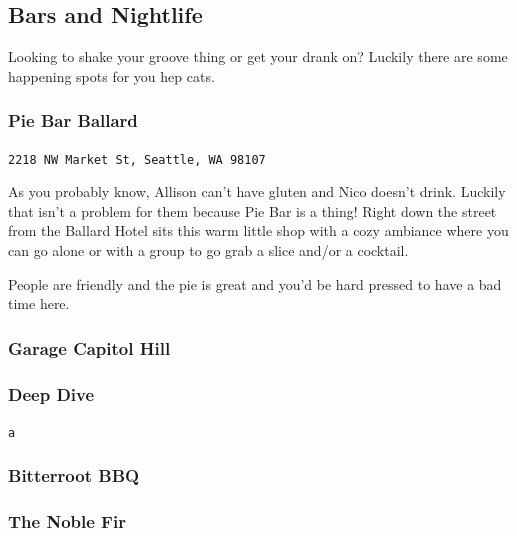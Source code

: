 \documentclass[12pt]{article}
\begin{document}
\newpage
\noindent\hrulefill 

\subsection{Bars and Nightlife}
Looking to shake your groove thing or get your drank on? Luckily there are some happening
spots for you hep cats.
\subsubsection{Pie Bar Ballard}
\begin{center}
    \texttt{2218 NW Market St, Seattle, WA 98107}
\end{center}

As you probably know, Allison can't have gluten and Nico doesn't drink. Luckily that isn't a problem 
for them because Pie Bar is a thing! Right down the street from the Ballard Hotel sits this warm
little shop with a cozy ambiance where you can go alone or with a group to go grab a slice and/or a cocktail.

People are friendly and the pie is great and you'd be hard pressed to have a bad time here.

\subsubsection{Garage Capitol Hill}

\subsubsection{Deep Dive}
\begin{center}
    \texttt{a}
\end{center}

\subsubsection{Bitterroot BBQ}

\subsubsection{The Noble Fir}
\end{document}
